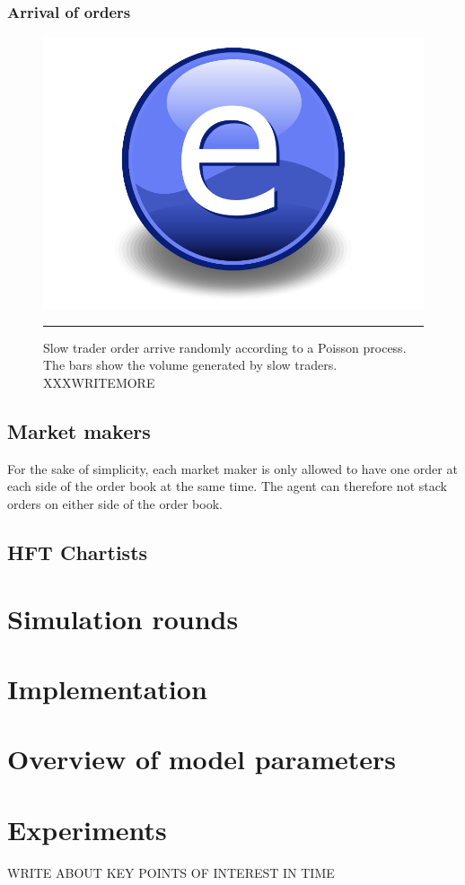 \subsubsection{Arrival of orders}\label{section:poisson_process}

\begin{figure}[htbp]
	\centering
		\includegraphics{Figures/Electron.pdf}
		\rule{35em}{0.5pt}
	\caption[Slow trader order arrival]{Slow trader order arrive randomly according to a Poisson process. The bars show the volume generated by slow traders. XXXWRITEMORE}
	\label{fig:poisson_arrival}
\end{figure}


\subsection{Market makers}\label{section:market_maker}
For the sake of simplicity, each market maker is only allowed to have one order at each side of the order book at the same time. The agent can therefore not stack orders on either side of the order book. 

\subsection{HFT Chartists}\label{section:hft_chartist}

\section{Simulation rounds}


\section{Implementation}


\section{Overview of model parameters}\label{section:overview_of_model_parameters}

\section{Experiments}\label{section:experiments}
WRITE ABOUT KEY POINTS OF INTEREST IN TIME



